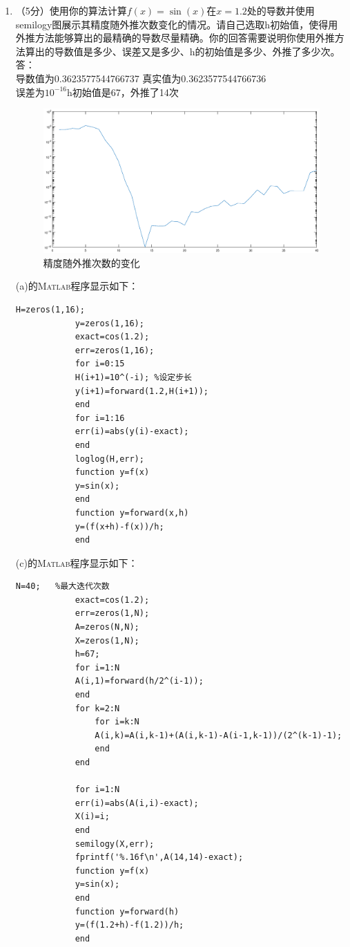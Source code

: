 \documentclass[12pt,a4paper,utf8]{ctexart}
\begin{document}
\begin{enumerate}
		\item[(c)] （5分）使用你的算法计算$f(x) = \sin(x)$在$x = 1.2$处的导数并使用semilogy图展示其精度随外推次数变化的情况。请自己选取h初始值，使得用外推方法能够算出的最精确的导数尽量精确。你的回答需要说明你使用外推方法算出的导数值是多少、误差又是多少、h的初始值是多少、外推了多少次。\\
		答：\\
		导数值为0.3623577544766737\quad
		真实值为0.3623577544766736\\
		误差为$10^{-16}$\quad h初始值是67，外推了14次
		\begin{figure}[H]  
			\centering
			\includegraphics[width=\textwidth]{semilogy1}
			\caption{精度随外推次数的变化}  
			\label{2}  
		\end{figure}
		(a)的\textsc{Matlab}程序显示如下：
		\begin{lstlisting}[breaklines,frame=single]
			H=zeros(1,16);
			y=zeros(1,16);
			exact=cos(1.2);
			err=zeros(1,16);
			for i=0:15
			H(i+1)=10^(-i); %设定步长
			y(i+1)=forward(1.2,H(i+1));
			end
			for i=1:16
			err(i)=abs(y(i)-exact);
			end
			loglog(H,err);
			function y=f(x)
			y=sin(x);
			end
			function y=forward(x,h)
			y=(f(x+h)-f(x))/h;
			end
		\end{lstlisting}		
		(c)的\textsc{Matlab}程序显示如下：
		\begin{lstlisting}[breaklines,frame=single]
			N=40;   %最大迭代次数
			exact=cos(1.2);
			err=zeros(1,N);
			A=zeros(N,N);
			X=zeros(1,N);
			h=67;
			for i=1:N
			A(i,1)=forward(h/2^(i-1));
			end
			for k=2:N
				for i=k:N
				A(i,k)=A(i,k-1)+(A(i,k-1)-A(i-1,k-1))/(2^(k-1)-1);
				end
			end
			
			for i=1:N
			err(i)=abs(A(i,i)-exact);
			X(i)=i;
			end
			semilogy(X,err);
			fprintf('%.16f\n',A(14,14)-exact);
			function y=f(x)
			y=sin(x);
			end
			function y=forward(h)
			y=(f(1.2+h)-f(1.2))/h;
			end
		\end{lstlisting}
		

\end{enumerate}
\end{document}

